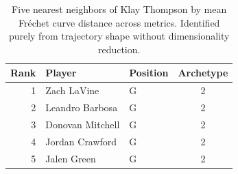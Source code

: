 \begin{table}[htbp]
  \centering\small
  \begin{tabular}{rllc}
    \toprule
    Rank & Player & Position & Archetype \\
    \midrule
    1 & Zach LaVine & G & 2 \\
    2 & Leandro Barbosa & G & 2 \\
    3 & Donovan Mitchell & G & 2 \\
    4 & Jordan Crawford & G & 2 \\
    5 & Jalen Green & G & 2 \\
    \bottomrule
  \end{tabular}
  \caption{Five nearest neighbors of Klay Thompson by mean Fr\'{e}chet curve distance across metrics. Identified purely from trajectory shape without dimensionality reduction.}
  \label{tab:Klay_Thompson_frechet_curve_neighbors}
\end{table}

